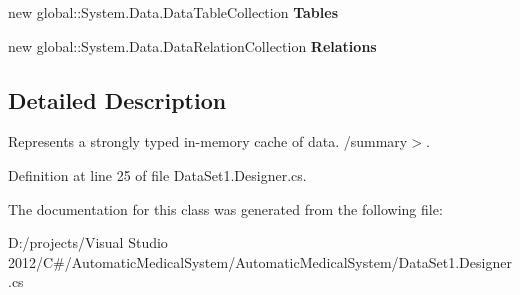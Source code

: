 \begin{CompactItemize}
\item 
new global::System.Data.DataTableCollection \textbf{Tables}\hspace{0.3cm}{\tt  [get]}\label{class_automatic_medical_system_1_1_data_set1_2c0c5bbc4f516efc1e89cf177ff93662}

\item 
new global::System.Data.DataRelationCollection \textbf{Relations}\hspace{0.3cm}{\tt  [get]}\label{class_automatic_medical_system_1_1_data_set1_472caa5c27b4c943f78d5bc1af1f2fdc}

\end{CompactItemize}


\subsection{Detailed Description}
Represents a strongly typed in-memory cache of data. /summary$>$. 

Definition at line 25 of file DataSet1.Designer.cs.

The documentation for this class was generated from the following file:\begin{CompactItemize}
\item 
D:/projects/Visual Studio 2012/C\#/AutomaticMedicalSystem/AutomaticMedicalSystem/DataSet1.Designer.cs\end{CompactItemize}

